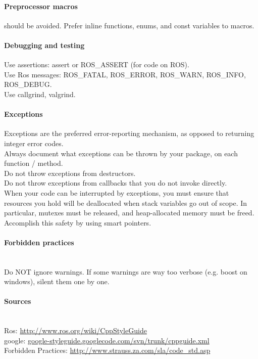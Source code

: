 \paragraph{Preprocessor macros} should be avoided. Prefer inline functions, enums, and const variables to macros.

\paragraph{Debugging and testing}
Use assertions: assert or ROS\_ASSERT (for code on ROS).\\
Use Ros messages: ROS\_FATAL, ROS\_ERROR, ROS\_WARN, ROS\_INFO, ROS\_DEBUG.\\
Use callgrind, valgrind.

\paragraph{Exceptions}

Exceptions are the preferred error-reporting mechanism, as opposed to returning integer error codes.\\
Always document what exceptions can be thrown by your package, on each function / method.\\
Do not throw exceptions from destructors.\\
Do not throw exceptions from callbacks that you do not invoke directly.\\


When your code can be interrupted by exceptions, you must ensure that resources you hold will be deallocated when stack variables go out of scope. In particular, mutexes must be released, and heap-allocated memory must be freed. 
Accomplish this safety by using smart pointers.

\paragraph{Forbidden practices}~\\
Do NOT ignore warnings. If some warnings are way too verbose (e.g. boost on windows), silent them one by one.



\paragraph{Sources}~\\
Ros: \url{http://www.ros.org/wiki/CppStyleGuide}\\
google: \url{google-styleguide.googlecode.com/svn/trunk/cppguide.xml}\\
Forbidden Practices: \url{http://www.strauss.za.com/sla/code_std.asp}\\




